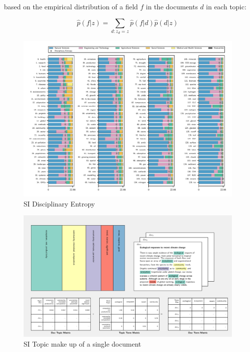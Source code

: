 \documentclass{article}
\begin{document}
\begin{linenumbers}
	based on the empirical distribution of a field \(f\) in the documents \(d\) in each topic:
	
	\begin{equation}
		\hat{p}(f|z) = \sum_{d:z_d=z} \hat{p} (f|d) \hat{p} (d|z)
	\end{equation}

	\begin{figure}
		\begin{center}
			\includegraphics[width=1\linewidth]{plots_pub/topic_oecd_entropy.pdf}
			\caption{SI Disciplinary Entropy}
			\label{dis-entropy}
		\end{center}
	\end{figure}	
	
	
	
	\begin{figure}
		\begin{center}
			\includegraphics[width=1\linewidth]{plots_pub/single_doc_3_536594_1861.pdf}
			\caption{SI Topic make up of a single document}
			\label{doc-topic}
		\end{center}
	\end{figure}


\end{linenumbers}
\end{document}
